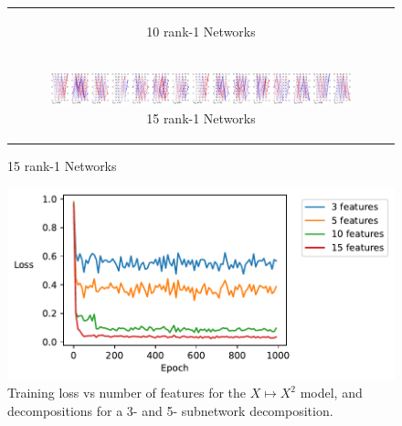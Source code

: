 \documentclass{article}
\theoremstyle{plain}
\theoremstyle{definition}
\theoremstyle{remark}
\begin{document}
\begin{figure}[ht]
\begin{minipage}{\textwidth}
\begin{tabular}{c}
\begin{subfigure}{0.3\textwidth}
                \caption{10 rank-1 Networks}
            \end{subfigure} \\ %
            \begin{subfigure}{0.3\textwidth}
                \centering
                \includegraphics[width=\linewidth]{../figures/s10_squared_decompositions_feature15.pdf}
                \caption{15 rank-1 Networks}
            \end{subfigure} 
        \end{tabular}
    \end{minipage}

\end{figure}

\begin{figure}[ht]
    \centerline{\includegraphics[width=\textwidth]{../figures/s11_squared_features_vs_loss.pdf}}
    \centering
    \caption{Training loss vs number of features for the $X \mapsto X^2$ model, and decompositions for a 3- and 5- subnetwork decomposition.}\label{fig:s11_squared_features_vs_loss}
\end{figure}
\end{document}
